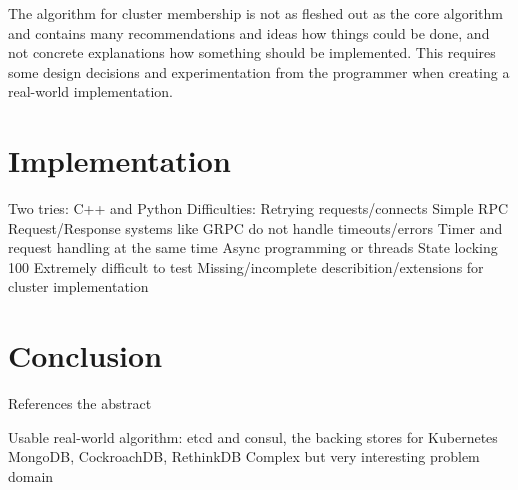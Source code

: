 The algorithm for cluster membership is not as fleshed out as the core algorithm and contains many recommendations and ideas how things could be done, and not 
concrete explanations how something should be implemented. This requires some design decisions and experimentation from the programmer when creating a real-world implementation.

\section{Implementation}
Two tries: C++ and Python
Difficulties:
Retrying requests/connects
Simple RPC Request/Response systems like GRPC do not handle timeouts/errors 
Timer and request handling at the same time
Async programming or threads
State locking
100%
Extremely difficult to test
Missing/incomplete describition/extensions for cluster implementation

\section{Conclusion}
References the abstract

Usable real-world algorithm:
etcd and consul, the backing stores for Kubernetes
MongoDB, CockroachDB, RethinkDB
Complex but very interesting problem domain



 


